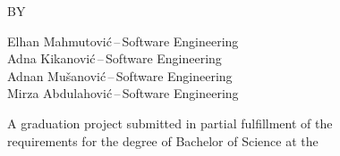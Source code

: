 \thispagestyle{empty}
\begin{center}
{\Large \MakeUppercase{\ProjectTitle}\par}

\vspace{2cm}

{\large BY\par}

\vspace{1cm}

{\large
Elhan Mahmutovi\'{c}\,--\,Software Engineering\\
Adna Kikanovi\'{c}\,--\,Software Engineering\\
Adnan Mu\v{s}anovi\'{c}\,--\,Software Engineering\\
Mirza Abdulahovi\'{c}\,--\,Software Engineering\par}

\vspace{2cm}

A graduation project submitted in partial fulfillment of the\\
requirements for the degree of Bachelor of Science at the\\
\FacultyName\\
\InstitutionName

\vspace{2cm}

{\SubmissionMonthYear}
\end{center}
\clearpage
